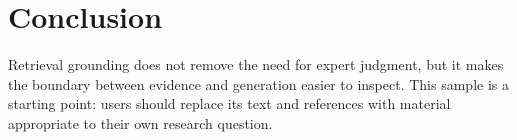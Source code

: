 \documentclass[11pt]{article}
\begin{document}
\section{Conclusion}
Retrieval grounding does not remove the need for expert judgment, but it makes the boundary between evidence and generation easier to inspect. This sample is a starting point: users should replace its text and references with material appropriate to their own research question.



\end{document}
